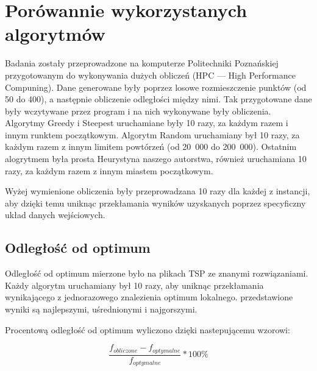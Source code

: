 \section{Porówannie wykorzystanych algorytmów}

Badania zostały przeprowadzone na komputerze Politechniki Poznańskiej przygotowanym do 
wykonywania dużych obliczeń (HPC --- High Performance Compuning). Dane generowane były 
poprzez losowe rozmieszczenie punktów (od 50 do 400), a następnie obliczenie odległości 
między nimi. Tak przygotowane dane były wczytywane przez program i na nich wykonywane były 
obliczenia. Algorytmy Greedy i Steepest uruchamiane były 10 razy, za każdym razem i innym 
runktem początkowym. Algorytm Random uruchamiany był 10 razy, za każdym razem z innym 
limitem powtórzeń (od 20~000 do 200~000). Ostatnim alogrytmem była prosta Heurystyna naszego
autorstwa, również uruchamiana 10 razy, za każdym razem z innym miastem początkowym.

Wyżej wymienione obliczenia były przeprowadzana 10 razy dla każdej z instancji, aby dzięki temu 
uniknąc przekłamania wyników uzyskanych poprzez specyficzny układ danych wejściowych.

\subsection{Odległość od optimum}

Odległość od optimum mierzone było na plikach TSP ze znanymi rozwiązaniami. Każdy algorytm 
uruchamiany był 10 razy, aby uniknąc przekłamania wynikającego z jednorazowego znalezienia 
optimum lokalnego. przedstawione wyniki są najlepszymi, uśrednionymi i najgorszymi.

Procentową odległość od optimum wyliczono dzięki nastepującemu wzorowi:

$$ \frac{f_{obliczone} - f_{optymalne}}{f_{optymalne}} * 100 \% $$

